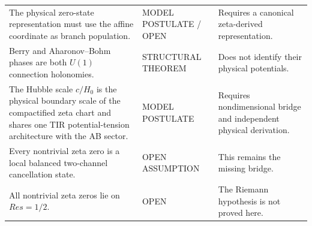 \documentclass[11pt,oneside]{book}
\theoremstyle{remark}
\newcommand{\Ree}{\operatorname{Re}}
\newcommand{\status}[1]{\textsf{#1}}
\def\Ree{Re}%
\begin{document}
\begin{longtable}{@{}p{}p{}p{}@{}}
The physical zero-state representation must use the affine coordinate as branch population. & \status{MODEL POSTULATE / OPEN} & Requires a canonical zeta-derived representation.\\
Berry and Aharonov--Bohm phases are both $U(1)$ connection holonomies. & \status{STRUCTURAL THEOREM} & Does not identify their physical potentials.\\
The Hubble scale $c/H_0$ is the physical boundary scale of the compactified zeta chart and shares one TIR potential-tension architecture with the AB sector. & \status{MODEL POSTULATE} & Requires nondimensional bridge and independent physical derivation.\\
Every nontrivial zeta zero is a local balanced two-channel cancellation state. & \status{OPEN ASSUMPTION} & This remains the missing bridge.\\
All nontrivial zeta zeros lie on $\Ree s=1/2$. & \status{OPEN} & The Riemann hypothesis is not proved here.\\
\bottomrule
\end{longtable}

\tableofcontents

\mainmatter















\appendix



\printindex
\end{document}
